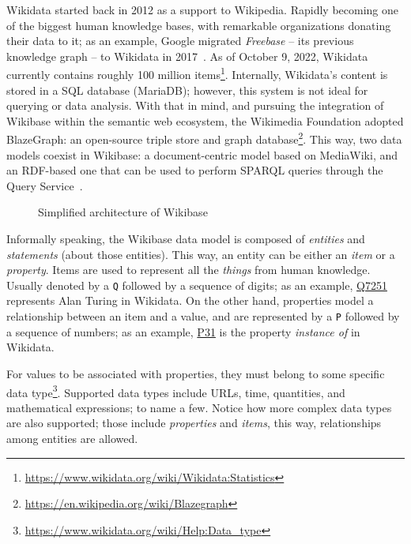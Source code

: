 Wikidata started back in 2012 as a support to Wikipedia. Rapidly becoming one of the biggest human knowledge bases, with remarkable organizations donating their data to it; as an example, Google migrated \textit{Freebase} -- its previous knowledge graph -- to Wikidata in 2017~\cite{10.1145/2872427.2874809}. As of October 9, 2022, Wikidata currently contains roughly 100 million items\footnote{\url{https://www.wikidata.org/wiki/Wikidata:Statistics}}. Internally, Wikidata's content is stored in a SQL database (MariaDB); however, this system is not ideal for querying or data analysis. With that in mind, and pursuing the integration of Wikibase within the semantic web ecosystem, the Wikimedia Foundation adopted BlazeGraph: an open-source triple store and graph database\footnote{\url{https://en.wikipedia.org/wiki/Blazegraph}}. This way, two data models coexist in Wikibase: a document-centric model based on MediaWiki, and an RDF-based one that can be used to perform SPARQL queries through the Query Service~\cite{https://doi.org/10.48550/arxiv.2110.11709}.

\begin{figure}[ht]
    \centering
    
    \caption[Simplified architecture of Wikibase]{Simplified architecture of Wikibase~\cite{https://doi.org/10.48550/arxiv.2110.11709}}
    \label{fig:architecture:wikibase}
\end{figure}

Informally speaking, the Wikibase data model is composed of \textit{entities} and \textit{statements} (about those entities). This way, an entity can be either an \textit{item} or a \textit{property}. Items are used to represent all the \textit{things} from human knowledge. Usually denoted by a \texttt{Q} followed by a sequence of digits; as an example, \href{https://www.wikidata.org/wiki/Q7251}{Q7251} represents Alan Turing in Wikidata. On the other hand, properties model a relationship between an item and a value, and are represented by a \texttt{P} followed by a sequence of numbers; as an example, \href{https://www.wikidata.org/wiki/Property:P31}{P31} is the property \textit{instance of} in Wikidata.

For values to be associated with properties, they must belong to some specific data type\footnote{\url{https://www.wikidata.org/wiki/Help:Data_type}}. Supported data types include URLs, time, quantities, and mathematical expressions; to name a few. Notice how more complex data types are also supported; those include \textit{properties} and \textit{items}, this way, relationships among entities are allowed.

